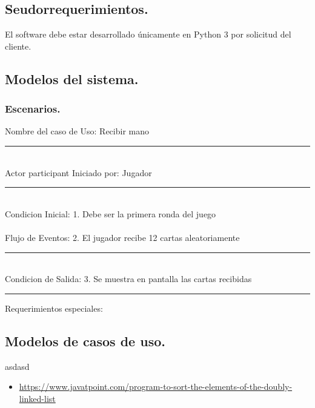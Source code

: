 \documentclass[60pt]{article}
\begin{document}
\subsection{Seudorrequerimientos.}\label{cap:seudorrequerimientos}
El software debe estar desarrollado únicamente en Python 3 por solicitud del cliente.
\subsection{Modelos del sistema.}\label{cap:modelos-sistema}

\subsubsection{Escenarios.}\label{cap:escenarios}

Nombre del caso de Uso: Recibir mano \\
\noindent\rule{17cm}{0.4pt}\\
Actor participant                    Iniciado por: Jugador\\
\noindent\rule{17cm}{0.4pt}\\
Condicion Inicial: 1. Debe ser la primera ronda del juego\\
\\
Flujo de Eventos:   2. El jugador recibe 12 cartas aleatoriamente\\
                    
\noindent\rule{17cm}{0.4pt}\\
Condicion de Salida: 3. Se muestra en pantalla las cartas recibidas\\

\noindent\rule{17cm}{0.4pt}
Requerimientos especiales:

\subsection{Modelos de casos de uso.}\label{cap:modelos-casos-uso}
asdasd

\begin{itemize}
    \item \url{https://www.javatpoint.com/program-to-sort-the-elements-of-the-doubly-linked-list}
\end{itemize}


% 
% 



\end{document}
